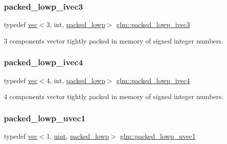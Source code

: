 \subsubsection{\texorpdfstring{packed\+\_\+lowp\+\_\+ivec3}{packed\_lowp\_ivec3}}
{\footnotesize\ttfamily typedef \hyperlink{structglm_1_1vec}{vec}$<$3, int, \hyperlink{namespaceglm_a36ed105b07c7746804d7fdc7cc90ff25ac36a4bd74559be2c0b65bc48e5953b8b}{packed\+\_\+lowp}$>$ \hyperlink{group__gtc__type__aligned_gac0de36c7d01951895c5e227817508a15}{glm\+::packed\+\_\+lowp\+\_\+ivec3}}



3 components vector tightly packed in memory of signed integer numbers. 

\mbox{\label{group__gtc__type__aligned_ga4f09d3093b0d71b2348a5a680f6badbd}} 
\subsubsection{\texorpdfstring{packed\+\_\+lowp\+\_\+ivec4}{packed\_lowp\_ivec4}}
{\footnotesize\ttfamily typedef \hyperlink{structglm_1_1vec}{vec}$<$4, int, \hyperlink{namespaceglm_a36ed105b07c7746804d7fdc7cc90ff25ac36a4bd74559be2c0b65bc48e5953b8b}{packed\+\_\+lowp}$>$ \hyperlink{group__gtc__type__aligned_ga4f09d3093b0d71b2348a5a680f6badbd}{glm\+::packed\+\_\+lowp\+\_\+ivec4}}



4 components vector tightly packed in memory of signed integer numbers. 

\mbox{\label{group__gtc__type__aligned_ga992b281fc2e3bf15c09f491393045ebc}} 
\subsubsection{\texorpdfstring{packed\+\_\+lowp\+\_\+uvec1}{packed\_lowp\_uvec1}}
{\footnotesize\ttfamily typedef \hyperlink{structglm_1_1vec}{vec}$<$1, \hyperlink{group__core__precision_ga4fd29415871152bfb5abd588334147c8}{uint}, \hyperlink{namespaceglm_a36ed105b07c7746804d7fdc7cc90ff25ac36a4bd74559be2c0b65bc48e5953b8b}{packed\+\_\+lowp}$>$ \hyperlink{group__gtc__type__aligned_ga992b281fc2e3bf15c09f491393045ebc}{glm\+::packed\+\_\+lowp\+\_\+uvec1}}



